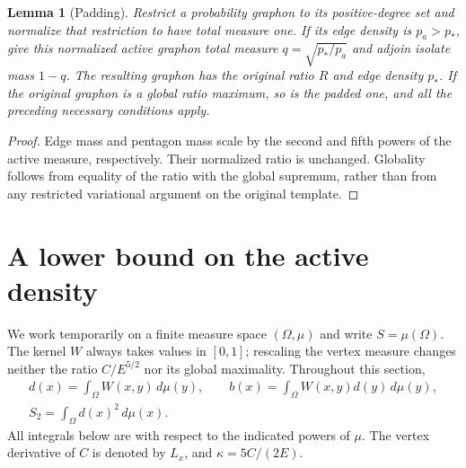 \documentclass[11pt]{amsart}
\newtheorem{lemma}[theorem]{Lemma}
\theoremstyle{definition}
\theoremstyle{remark}
\begin{document}
\begin{lemma}[Padding]\label{lem:padding}
Restrict a probability graphon to its positive-degree set and normalize
that restriction to have total measure one. If its edge density is
\(p_a>p_*\), give this normalized active graphon total measure
\(q=\sqrt{p_*/p_a}\) and adjoin isolate mass \(1-q\). The resulting graphon
has the original ratio \(R\) and edge density \(p_*\). If the original
graphon is a global ratio maximum, so is the padded one, and all the
preceding necessary conditions apply.
\end{lemma}
\begin{proof}
Edge mass and pentagon mass scale by the second and fifth powers of the
active measure, respectively. Their normalized ratio is unchanged.
Globality follows from equality of the ratio with the global supremum,
rather than from any restricted variational argument on the original
template.
\end{proof}

\section{A lower bound on the active density}

We work temporarily on a finite measure space \((\Omega,\mu)\) and write
\(S=\mu(\Omega)\). The kernel \(W\) always takes values in \([0,1]\);
rescaling the vertex measure changes neither the ratio \(C/E^{5/2}\) nor
its global maximality. Throughout this section,
\[
 \begin{gathered}
 d(x)=\int_\Omega W(x,y)\,d\mu(y),\qquad
 b(x)=\int_\Omega W(x,y)d(y)\,d\mu(y),\\
 S_2=\int_\Omega d(x)^2\,d\mu(x).
 \end{gathered}
\]
All integrals below are with respect to the indicated powers of \(\mu\).
The vertex derivative of \(C\) is denoted by \(L_x\), and
\(\kappa=5C/(2E)\).
\end{document}
